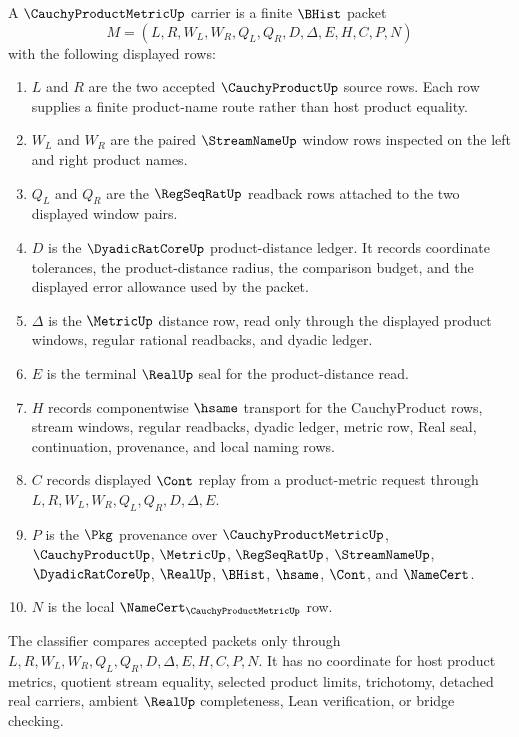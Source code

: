 \begin{definition}
\label{def:cauchy-product-metric-carrier}
A $\CauchyProductMetricUp$ carrier is a finite $\BHist$ packet
$$
M=(L,R,W_L,W_R,Q_L,Q_R,D,\Delta,E,H,C,P,N)
$$
with the following displayed rows:
\begin{enumerate}
\item $L$ and $R$ are the two accepted $\CauchyProductUp$ source rows. Each row supplies a finite product-name route rather than host product equality.
\item $W_L$ and $W_R$ are the paired $\StreamNameUp$ window rows inspected on the left and right product names.
\item $Q_L$ and $Q_R$ are the $\RegSeqRatUp$ readback rows attached to the two displayed window pairs.
\item $D$ is the $\DyadicRatCoreUp$ product-distance ledger. It records coordinate tolerances, the product-distance radius, the comparison budget, and the displayed error allowance used by the packet.
\item $\Delta$ is the $\MetricUp$ distance row, read only through the displayed product windows, regular rational readbacks, and dyadic ledger.
\item $E$ is the terminal $\RealUp$ seal for the product-distance read.
\item $H$ records componentwise $\hsame$ transport for the CauchyProduct rows, stream windows, regular readbacks, dyadic ledger, metric row, Real seal, continuation, provenance, and local naming rows.
\item $C$ records displayed $\Cont$ replay from a product-metric request through $L,R,W_L,W_R,Q_L,Q_R,D,\Delta,E$.
\item $P$ is the $\Pkg$ provenance over $\CauchyProductMetricUp$, $\CauchyProductUp$, $\MetricUp$, $\RegSeqRatUp$, $\StreamNameUp$, $\DyadicRatCoreUp$, $\RealUp$, $\BHist$, $\hsame$, $\Cont$, and $\NameCert$.
\item $N$ is the local $\NameCert_{\CauchyProductMetricUp}$ row.
\end{enumerate}
The classifier compares accepted packets only through $L,R,W_L,W_R,Q_L,Q_R,D,\Delta,E,H,C,P,N$. It has no coordinate for host product metrics, quotient stream equality, selected product limits, trichotomy, detached real carriers, ambient $\RealUp$ completeness, Lean verification, or bridge checking.
\end{definition}

